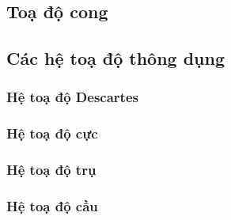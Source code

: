 \subsection{Toạ độ cong}
\subsection{Các hệ toạ độ thông dụng}
\subsubsection*{Hệ toạ độ Descartes}
\subsubsection*{Hệ toạ độ cực}
\subsubsection*{Hệ toạ độ trụ}
\subsubsection*{Hệ toạ độ cầu}
